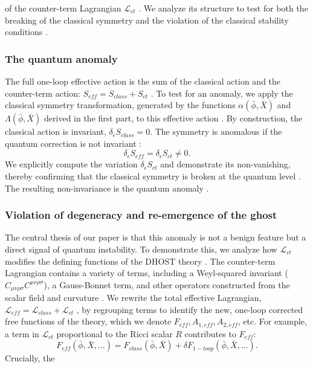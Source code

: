\documentclass[twocolumn]{aastex631}
\begin{document}
of the counter-term Lagrangian $\mathcal{L}_{ct}$  \citep{sharma2023galileanfermionsclassicalquantum,krššák2025einsteingravityeinsteinaction,solera2026symmetryrestoringfinitecountertermssmeft}. We analyze its structure to test for both the breaking of the classical symmetry and the violation of the classical stability conditions  \citep{solera2026symmetryrestoringfinitecountertermssmeft}.\subsubsection{The quantum anomaly}The full one-loop effective action is the sum of the classical action and the counter-term action: $S_{eff} = S_{class} + S_{ct}$ \citep{avramidi1996covariantmethodscalculationeffective,chakrabortty2025loopthermaleffectiveaction}. To test for an anomaly, we apply the classical symmetry transformation, generated by the functions $\alpha(\bar{\phi}, \bar{X})$ and $\Lambda(\bar{\phi}, \bar{X})$ derived in the first part, to this effective action \citep{wetterich2024fieldtransformationsfunctionalintegral}. By construction, the classical action is invariant, $\delta_\epsilon S_{class} = 0$. The symmetry is anomalous if the quantum correction is not invariant \citep{avramidi1996covariantmethodscalculationeffective,chakrabortty2025loopthermaleffectiveaction}:\begin{equation}\delta_\epsilon S_{eff} = \delta_\epsilon S_{ct} \neq 0.\end{equation}We explicitly compute the variation $\delta_\epsilon S_{ct}$ and demonstrate its non-vanishing, thereby confirming that the classical symmetry is broken at the quantum level \citep{coon2002anomaliesquantummechanics1r2,seiberg2025anomalouscontinuoustranslations}. The resulting non-invariance is the quantum anomaly \citep{mauro2005cancellationanomaliespathintegral}.\subsubsection{Violation of degeneracy and re-emergence of the ghost}The central thesis of our paper is that this anomaly is not a benign feature but a direct signal of quantum instability. To demonstrate this, we analyze how $\mathcal{L}_{ct}$ modifies the defining functions of the DHOST theory \citep{gao2019higherderivativescalartensortheory}. The counter-term Lagrangian contains a variety of terms, including a Weyl-squared invariant ($C_{\mu\nu\rho\sigma}C^{\mu\nu\rho\sigma}$), a Gauss-Bonnet term, and other operators constructed from the scalar field and curvature \citep{brandt2022quantumgravitygeneralbackground}. We rewrite the total effective Lagrangian, $\mathcal{L}_{eff} = \mathcal{L}_{class} + \mathcal{L}_{ct}$ \citep{brandt2026equivalencesecondorderformulations}, by regrouping terms to identify the new, one-loop corrected free functions of the theory, which we denote $F_{eff}, A_{1,eff}, A_{2,eff}$, etc. For example, a term in $\mathcal{L}_{ct}$ proportional to the Ricci scalar $R$ contributes to $F_{eff}$:\begin{equation}F_{eff}(\bar{\phi}, \bar{X}, \dots) = F_{class}(\bar{\phi}, \bar{X}) + \delta F_{1-loop}(\bar{\phi}, \bar{X}, \dots).\end{equation}Crucially, the 
\end{document}
